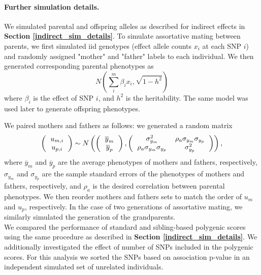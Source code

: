 \documentclass[hidelinks, 12pt]{article}
\begin{document}
\paragraph{Further simulation details.}
\label{assortative_sim_details} 
We simulated parental and offspring alleles as described for indirect effects in {\bf Section \ref{indirect_sim_details}}. To simulate assortative mating between parents, we first simulated iid genotypes (effect allele counts $x_i$ at each SNP $i$) and randomly assigned "mother" and "father" labels to each individual. We then generated corresponding parental phenotypes as
$$N(\sum_i^m\beta_ix_i,\sqrt{1-h^2})$$ where  $\beta_i$ is the effect of SNP $i$, and $h^2$ is the heritability.  The same model was used later to generate offspring phenotypes.

We paired mothers and fathers as follows: we generated a random matrix  
\[ 
\left (
  \begin{tabular}{c}
  $u_{m,i}$ \\
  $u_{p,i}$
  \end{tabular}
\right ) \sim N
\left ( \left (
  \begin{tabular}{c}
  $\overline{y}_m$ \\
  $\overline{y}_p$
  \end{tabular}
\right ),
\left (
  \begin{tabular}{cc}
  $\sigma_{y_m}^2$ & $\rho_a \sigma_{y_m} \sigma_{y_p}$  \\
  $\rho_a \sigma_{y_m} \sigma_{y_p}$ & $\sigma_{y_p}^2$ 
  \end{tabular}
\right )\right ), 
\] where $\overline{y}_m$ and $\overline{y}_p$ are the average phenotypes of mothers and fathers, respectively, $\sigma_{y_m}$ and $\sigma_{y_p}$ are the sample standard errors of the phenotypes of mothers and fathers, respectively, and $\rho_a$ is the desired correlation between parental phenotypes.  We then reorder mothers and fathers sets to match the order of $u_m$ and $u_p$, respectively. In the case of two generations of assortative mating, we similarly simulated the generation of the grandparents.\\

We compared the performance of standard and sibling-based polygenic scores using the same procedure as described in {\bf Section \ref{indirect_sim_details}}. We additionally investigated the effect of number of SNPs included in the polygenic scores. For this analysis we sorted the SNPs based on association p-value in an independent simulated set of unrelated individuals.\\ 
\end{document}
